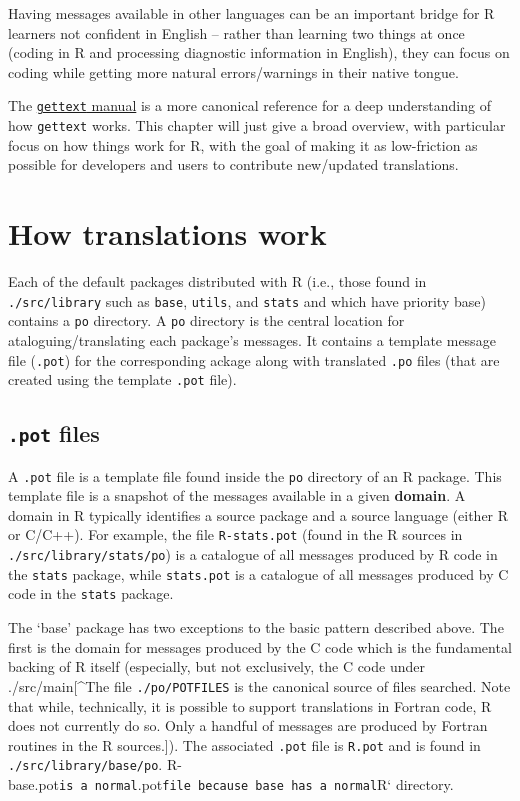 \documentclass[
]{book}
\begin{document}
Having messages available in other languages can be an important bridge
for R learners not confident in English -- rather than learning two
things at once (coding in R and processing diagnostic information in
English), they can focus on coding while getting more natural
errors/warnings in their native tongue.

The \href{https://www.gnu.org/software/gettext/manual/index.html}{\texttt{gettext}
manual} is a
more canonical reference for a deep understanding of how \texttt{gettext}
works. This chapter will just give a broad overview, with particular
focus on how things work for R, with the goal of making it as
low-friction as possible for developers and users to contribute
new/updated translations.

\section{How translations work}\label{how-translations-work}

Each of the default packages distributed with R (i.e., those found in
\texttt{./src/library} such as \texttt{base}, \texttt{utils}, and \texttt{stats} and which have
priority base) contains a \texttt{po} directory. A \texttt{po} directory is the
central location for ataloguing/translating each package's messages. It
contains a template message file (\texttt{.pot}) for the corresponding ackage
along with translated \texttt{.po} files (that are created using the template
\texttt{.pot} file).

\subsection{\texorpdfstring{\texttt{.pot} files}{.pot files}}\label{pot-files}

A \texttt{.pot} file is a template file found inside the \texttt{po} directory of an R
package. This template file is a snapshot of the messages available in a
given \textbf{domain}. A domain in R typically identifies a source package
and a source language (either R or C/C++). For example, the file
\texttt{R-stats.pot} (found in the R sources in \texttt{./src/library/stats/po}) is a
catalogue of all messages produced by R code in the \texttt{stats} package,
while \texttt{stats.pot} is a catalogue of all messages produced by C code in
the \texttt{stats} package.

The `base' package has two exceptions to the basic pattern described
above. The first is the domain for messages produced by the C code which
is the fundamental backing of R itself (especially, but not exclusively,
the C code under ./src/main{[}\^{}The file \texttt{./po/POTFILES} is the canonical
source of files searched. Note that while, technically, it is possible
to support translations in Fortran code, R does not currently do so.
Only a handful of messages are produced by Fortran routines in the R
sources.{]}). The associated \texttt{.pot} file is \texttt{R.pot} and is found in
\texttt{./src/library/base/po}.
R-base.pot\texttt{is\ a\ normal}.pot\texttt{file\ because\ base\ has\ a\ normal}R`
directory.
\end{document}
